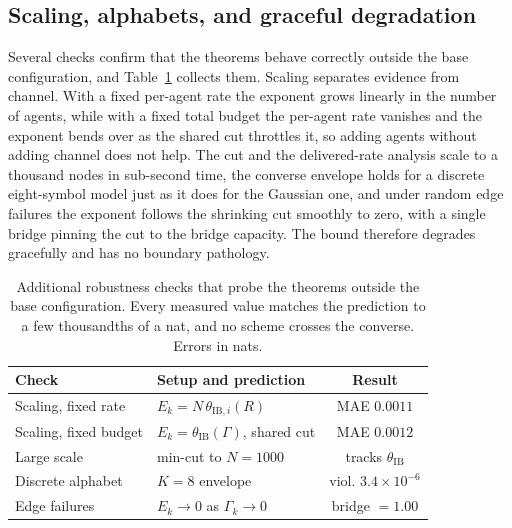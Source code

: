 \documentclass[journal]{IEEEtran}
\theoremstyle{definition}
\theoremstyle{remark}
\newcommand{\tib}{\theta_{\mathrm{IB}}}
\newcommand{\tibi}{\theta_{\mathrm{IB},i}}
\newcommand{\Gk}{\Gamma_k}
\begin{document}
\subsection{Scaling, alphabets, and graceful degradation}
Several checks confirm that the theorems behave correctly outside the base configuration, and
Table~\ref{tab:results} collects them. Scaling separates evidence from channel. With a fixed per-agent rate the
exponent grows linearly in the number of agents, while with a fixed total budget the per-agent rate vanishes and
the exponent bends over as the shared cut throttles it, so adding agents without adding channel does not help.
The cut and the delivered-rate analysis scale to a thousand nodes in sub-second time, the converse envelope holds
for a discrete eight-symbol model just as it does for the Gaussian one, and under random edge failures the
exponent follows the shrinking cut smoothly to zero, with a single bridge pinning the cut to the bridge capacity.
The bound therefore degrades gracefully and has no boundary pathology.

\begin{table}[t]
\centering
\caption{Additional robustness checks that probe the theorems outside the base configuration. Every measured value
matches the prediction to a few thousandths of a nat, and no scheme crosses the converse. Errors in nats.}
\label{tab:results}
\renewcommand{\arraystretch}{1.25}
\footnotesize
\setlength{\tabcolsep}{3pt}
\begin{tabular}{@{}llc@{}}
\toprule
Check & Setup and prediction & Result \\
\midrule
Scaling, fixed rate & $E_k=N\,\tibi(R)$ & MAE $0.0011$ \\
Scaling, fixed budget & $E_k=\tib(\Gamma)$, shared cut & MAE $0.0012$ \\
Large scale & min-cut to $N=1000$ & tracks $\tib$ \\
Discrete alphabet & $K=8$ envelope & viol. $3.4\!\times\!10^{-6}$ \\
Edge failures & $E_k\to0$ as $\Gk\to0$ & bridge $=1.00$ \\
\bottomrule
\end{tabular}
\end{table}
\end{document}
